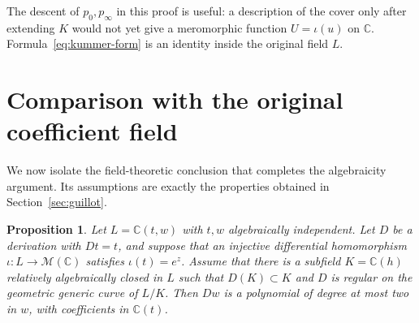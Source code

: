 \documentclass[11pt,reqno]{amsart}
\numberwithin{equation}{section}
\newtheorem{proposition}[theorem]{Proposition}
\theoremstyle{definition}
\theoremstyle{remark}
\newcommand{\C}{\mathbb C}
\newcommand{\MM}{\mathcal M}
\begin{document}
The descent of $p_0,p_\infty$ in this proof is useful: a description
of the cover only after extending $K$ would not yet give a meromorphic
function $U=\iota(u)$ on $\C$. Formula~\eqref{eq:kummer-form} is an
identity inside the original field $L$.

\section{Comparison with the original coefficient field}
\label{sec:comparison}

We now isolate the field-theoretic conclusion that completes the
algebraicity argument. Its assumptions are exactly the properties
obtained in Section~\ref{sec:guillot}.

\begin{proposition}
\label{prop:comparison}
Let $L=\C(t,w)$ with $t,w$ algebraically independent. Let $D$ be a
derivation with $Dt=t$, and suppose that an injective differential
homomorphism $\iota:L\to\MM(\C)$ satisfies $\iota(t)=e^z$.
Assume that there is a subfield $K=\C(h)$ relatively algebraically
closed in $L$ such that $D(K)\subset K$ and $D$ is regular on the
geometric generic curve of $L/K$. Then $Dw$ is a polynomial of degree
at most two in $w$, with coefficients in $\C(t)$.
\end{proposition}
\end{document}

